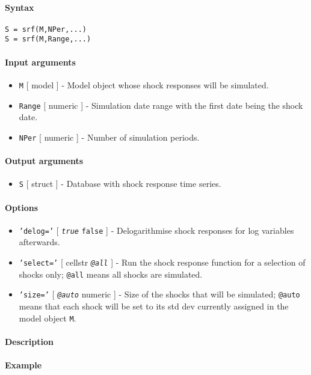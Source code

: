 


	\paragraph{Syntax}

\begin{verbatim}
S = srf(M,NPer,...)
S = srf(M,Range,...)
\end{verbatim}

\paragraph{Input arguments}

\begin{itemize}
\item
  \texttt{M} {[} model {]} - Model object whose shock responses will be
  simulated.
\item
  \texttt{Range} {[} numeric {]} - Simulation date range with the first
  date being the shock date.
\item
  \texttt{NPer} {[} numeric {]} - Number of simulation periods.
\end{itemize}

\paragraph{Output arguments}

\begin{itemize}
\itemsep1pt\parskip0pt
\item
  \texttt{S} {[} struct {]} - Database with shock response time series.
\end{itemize}

\paragraph{Options}

\begin{itemize}
\item
  \texttt{'delog='} {[} \emph{\texttt{true}} \textbar{} \texttt{false}
  {]} - Delogarithmise shock responses for log variables afterwards.
\item
  \texttt{'select='} {[} cellstr \textbar{} \emph{\texttt{@all}} {]} -
  Run the shock response function for a selection of shocks only;
  \texttt{@all} means all shocks are simulated.
\item
  \texttt{'size='} {[} \emph{\texttt{@auto}} \textbar{} numeric {]} -
  Size of the shocks that will be simulated; \texttt{@auto} means that
  each shock will be set to its std dev currently assigned in the model
  object \texttt{M}.
\end{itemize}

\paragraph{Description}

\paragraph{Example}


